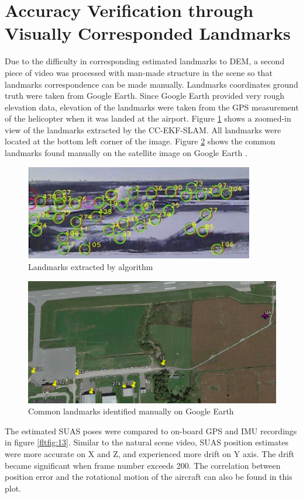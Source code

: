 \section{Accuracy Verification through Visually Corresponded Landmarks}
\label{sec:flight-manual}
Due to the difficulty in corresponding estimated landmarks to DEM, a
second piece of video was processed with man-made structure in the
scene so that landmarks correspondence can be made manually. Landmarks
coordinates ground truth were taken from Google Earth. Since Google
Earth provided very rough elevation data, elevation of the landmarks
were taken from the GPS measurement of the helicopter when it was
landed at the airport. Figure \ref{fltfig:11} shows a zoomed-in view
of the landmarks extracted by the CC-EKF-SLAM. All landmarks were
located at the bottom left corner of the image. Figure \ref{fltfig:12}
shows the common landmarks found manually on the satellite image on
Google Earth \cite{_google_????}.

\begin{figure}[h]
\centering
\includegraphics[width=10cm, keepaspectratio=true]
{./Figures/fltfig/airport/frame398_landmarks.jpg}
\caption{Landmarks extracted by algorithm }
\label{fltfig:11}
\end{figure}

\begin{figure}[h]
\centering
\includegraphics[width=13cm, keepaspectratio=true]
{./Figures/fltfig/airport/uav_and_identified_landmark.png}
\caption{Common landmarks identified manually on Google Earth }
\label{fltfig:12}
\end{figure}
\FloatBarrier The estimated SUAS poses were compared to on-board GPS
and IMU recordings in figure \ref{fltfig:13}. Similar to the natural
scene video, SUAS position estimates were more accurate on X and Z,
and experienced more drift on Y axis. The drift became significant
when frame number exceeds 200. The correlation between position error
and the rotational motion of the aircraft can also be found in this
plot.

